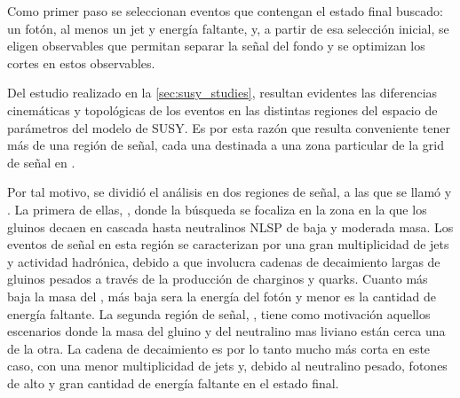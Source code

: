 
Como primer paso se seleccionan eventos que contengan el estado final buscado:
un fotón, al menos un jet y energía faltante, y, a partir de esa selección
inicial, se eligen observables que permitan separar la señal del fondo y se
optimizan los cortes en estos observables.



Del estudio realizado en la \cref{sec:susy_studies}, resultan evidentes las diferencias
cinemáticas y topológicas de los eventos en las distintas regiones del
espacio de parámetros {\mgmn} del modelo de SUSY.
Es por esta razón que resulta conveniente tener más de una región de señal,
cada una destinada a una zona particular de la grid de señal en {\mgmn}.


Por tal motivo, se dividió el análisis en dos regiones de señal, a las que se
llamó {\SRL} y {\SRH}. La primera de ellas, \SRL, donde la búsqueda se focaliza en la zona en la que
los gluinos decaen en cascada hasta neutralinos NLSP de baja y
moderada masa. Los eventos de señal en esta región se caracterizan por una gran
multiplicidad de jets y actividad hadrónica, debido a que involucra cadenas de
decaimiento largas de gluinos pesados a través de la producción de charginos y quarks.
Cuanto más baja la masa del {\ninoone}, más baja sera la energía del fotón y
menor es la cantidad de energía faltante. La segunda región de señal, \SRH,
tiene como motivación aquellos escenarios donde la masa del gluino y del neutralino
mas liviano están cerca una de la otra. La cadena de decaimiento es por lo tanto
mucho más corta en este caso, con una menor multiplicidad de jets y, debido al
neutralino pesado, fotones de alto {\pt} y gran cantidad de energía faltante en
el estado final.

